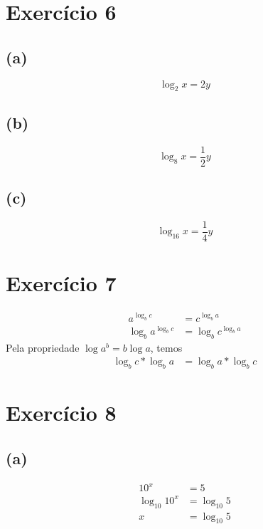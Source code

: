 \documentclass{article}
\begin{document}
\section{Exercício 6}
\subsection*{(a)}
\begin{equation}
	\log_2 x = 2y
\end{equation}

\subsection*{(b)}
\begin{equation}
	\log_8 x = \dfrac{1}{2}y
\end{equation}

\subsection*{(c)}
\begin{equation}
	\log_{16} x = \dfrac{1}{4}y
\end{equation}

\section{Exercício 7}
\begin{equation}
\begin{split}
    a^{\log_b c}  & = c^{\log_b a}\\
    \log_b a^{\log_b c} & = \log_b c^{\log_b a}
\end{split}
\end{equation}
    Pela propriedade $\log a^b = b \log a$, temos
\begin{equation}
\begin{split}
    \log_b c * \log_b a & = \log_b a * \log_b c
\end{split}
\end{equation}



\section{Exercício 8}
\subsection*{(a)}
\begin{equation}
\begin{split}
	10^x & = 5\\
	\log_{10}10^x & = \log_{10}5\\
	 x & = \log_{10}5\\
\end{split}
\end{equation}
\end{document}

